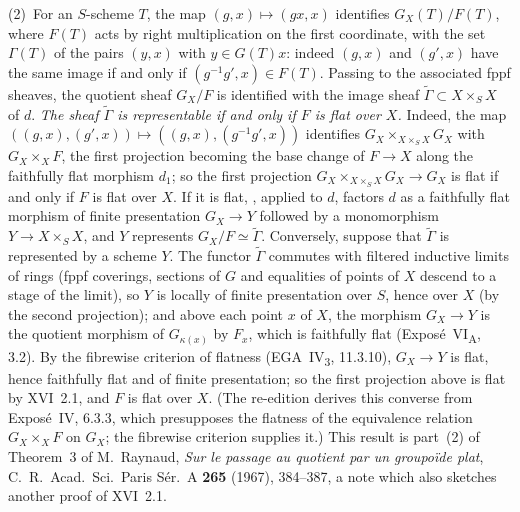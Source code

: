 (2)~For an \(S\)-scheme \(T\), the map \((g,x)\mapsto(gx,x)\) identifies
\(G_X(T)/F(T)\), where \(F(T)\) acts by right multiplication on the first
coordinate, with the set \(\Gamma(T)\) of the pairs \((y,x)\) with
\(y\in G(T)x\): indeed \((g,x)\) and \((g',x)\) have the same image if and only
if \((g^{-1}g',x)\in F(T)\). Passing to the associated fppf sheaves, the
quotient sheaf \(G_X/F\) is identified with the image sheaf
\(\widetilde\Gamma\subset X\times_SX\) of \(d\). \emph{The sheaf \(\widetilde\Gamma\) is
representable if and only if \(F\) is flat over \(X\).} Indeed, the map
\(((g,x),(g',x))\mapsto((g,x),(g^{-1}g',x))\) identifies
\(G_X\times_{X\times_SX}G_X\) with \(G_X\times_XF\), the first projection becoming
the base change of \(F\to X\) along the faithfully flat morphism \(d_1\); so
the first projection \(G_X\times_{X\times_SX}G_X\to G_X\) is flat if and only if
\(F\) is flat over \(X\). If it is flat, , applied to \(d\),
factors \(d\) as a faithfully flat morphism of finite presentation \(G_X\to Y\)
followed by a monomorphism \(Y\to X\times_SX\), and \(Y\) represents
\(G_X/F\simeq\widetilde\Gamma\). Conversely, suppose that \(\widetilde\Gamma\) is
represented by a scheme \(Y\). The functor \(\widetilde\Gamma\) commutes with
filtered inductive limits of rings (fppf coverings, sections of \(G\) and
equalities of points of \(X\) descend to a stage of the limit), so \(Y\) is
locally of finite presentation over \(S\), hence over \(X\) (by the second
projection); and above each point \(x\) of \(X\), the morphism \(G_X\to Y\) is
the quotient morphism of \(G_{\kappa(x)}\) by \(F_x\), which is faithfully flat
(Exposé~VI\textsubscript{A}, 3.2). By the fibrewise criterion of flatness
(EGA~IV\textsubscript{3}, 11.3.10), \(G_X\to Y\) is flat, hence faithfully flat and
of finite presentation; so the first projection above is flat by
XVI~2.1, and \(F\) is flat over \(X\). (The re-edition derives this converse
from Exposé~IV, 6.3.3, which presupposes the flatness of the equivalence
relation \(G_X\times_XF\) on \(G_X\); the fibrewise criterion supplies it.) This
result is part~(2) of Theorem~3 of M.~Raynaud, \emph{Sur le passage au
quotient par un groupoïde plat}, C.~R.\ Acad.\ Sci.\ Paris Sér.~A
\textbf{265} (1967), 384--387, a note which also sketches another proof of
XVI~2.1.

